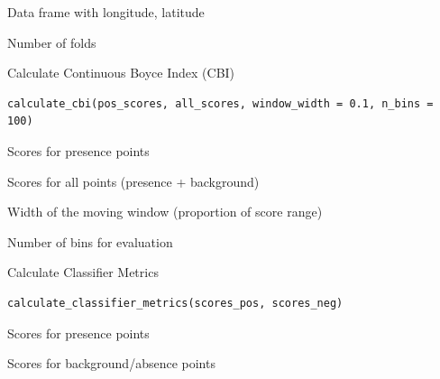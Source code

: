 \documentclass[letterpaper]{book}
\begin{document}
%
\begin{Arguments}
\begin{ldescription}
\item[\code{df}] Data frame with longitude, latitude

\item[\code{n\_folds}] Number of folds
\end{ldescription}
\end{Arguments}
%
\begin{Description}
Calculate Continuous Boyce Index (CBI)
\end{Description}
%
\begin{Usage}
\begin{verbatim}
calculate_cbi(pos_scores, all_scores, window_width = 0.1, n_bins = 100)
\end{verbatim}
\end{Usage}
%
\begin{Arguments}
\begin{ldescription}
\item[\code{pos\_scores}] Scores for presence points

\item[\code{all\_scores}] Scores for all points (presence + background)

\item[\code{window\_width}] Width of the moving window (proportion of score range)

\item[\code{n\_bins}] Number of bins for evaluation
\end{ldescription}
\end{Arguments}
%
\begin{Description}
Calculate Classifier Metrics
\end{Description}
%
\begin{Usage}
\begin{verbatim}
calculate_classifier_metrics(scores_pos, scores_neg)
\end{verbatim}
\end{Usage}
%
\begin{Arguments}
\begin{ldescription}
\item[\code{scores\_pos}] Scores for presence points

\item[\code{scores\_neg}] Scores for background/absence points
\end{ldescription}
\end{Arguments}
\end{document}
